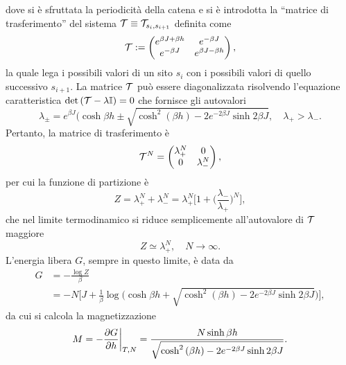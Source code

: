 dove si è sfruttata la periodicità della catena e si è introdotta la ``matrice di trasferimento'' del sistema $\mathcal{T} \equiv \mathcal{T}_{s_i,s_{i+1}}$ definita come 
\begin{equation}
    \mathcal{T} := 
    \begin{pmatrix}
        e^{\beta J + \beta h} & e^{-\beta J} \\
        e^{-\beta J} & e^{\beta J - \beta h}
    \end{pmatrix},
\end{equation}
la quale lega i possibili valori di un sito $s_i$ con i possibili valori di quello successivo $s_{i+1}$. La matrice $\mathcal{T}$ può essere diagonalizzata risolvendo l'equazione caratteristica $\det{(\mathcal{T}- \lambda\mathbb{I})} = 0$ che fornisce gli autovalori 
\begin{equation}
\label{eq: autovalori matrice trasferimento}
    \lambda_\pm = e^{\beta J}(\cosh{\beta h} \pm \sqrt{\cosh^2{(\beta h)} - 2e^{-2\beta J}\sinh{2\beta J}},\quad \lambda_+ > \lambda_-.
\end{equation}
Pertanto, la matrice di trasferimento è
\begin{equation}
    \mathcal{T}^N = 
    \begin{pmatrix}
        \lambda_+^N & 0 \\
        0 & \lambda_-^N
    \end{pmatrix},
\end{equation}
per cui la funzione di partizione è
\begin{equation}
\label{eq: funzione di partizione Ising D=1}
    Z = \lambda_+^N + \lambda_-^N = \lambda_+^N\bigg[1 + \bigg(\frac{\lambda_-}{\lambda_+}\bigg)^N\bigg],
\end{equation}
che nel limite termodinamico si riduce semplicemente all'autovalore di $\mathcal{T}$ maggiore
\begin{equation}
\label{eq: funzione di partizione Ising D=1 (limite TD)}
    Z \simeq \lambda_+^N,\quad N \to \infty.
\end{equation}
L'energia libera $G$, sempre in questo limite, è data da
\begin{equation}
    \begin{split}
        G &= -\frac{\log{Z}}{\beta} \\
        &=-N\bigg[J + \frac{1}{\beta}\log{\bigg(\cosh{\beta h} + \sqrt{\cosh^2{(\beta h)} - 2e^{-2\beta J}\sinh{2\beta J}}\bigg)}\bigg],
    \end{split}
\end{equation}
da cui si calcola la magnetizzazione
\begin{equation}
    M = -\frac{\partial G}{\partial h}\bigg|_{T,N} =  \frac{N\sinh{\beta h}}{\sqrt{\cosh^2{(\beta h)} - 2e^{-2\beta J}\sinh{2\beta J}}}.
\end{equation}
